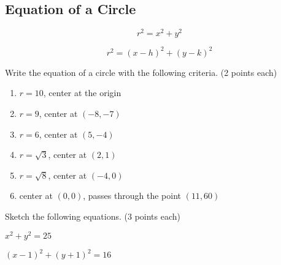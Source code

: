 \documentclass[12pt]{article}
\begin{document}
\pagebreak

\subsection*{Equation of a Circle}

$$r^2=x^2+y^2$$

$$r^2=(x-h)^2+(y-k)^2$$

Write the equation of a circle with the following criteria. (2 points each)\\

\begin{enumerate}[resume]

	\item $r=10$, center at the origin\\
	
	\item $r=9$, center at $(-8,-7)$\\
	
	\item $r=6$, center at $(5,-4)$\\
	
	\item $r=\sqrt{3}$, center at $(2,1)$\\
	
	\item $r=\sqrt{8}$, center at $(-4,0)$\\
	
	\item center at $(0,0)$, passes through the point $(11,60)$\\
	
	
\end{enumerate}

\hrulefill

Sketch the following equations. (3 points each)\\

\begin{enumerate}[resume]
\begin{multicols}{2}

	\item $x^2+y^2=25$\\
	
	
	\item $(x-1)^2+(y+1)^2=16$\\
	

\end{multicols}
\end{enumerate}
\end{document}
